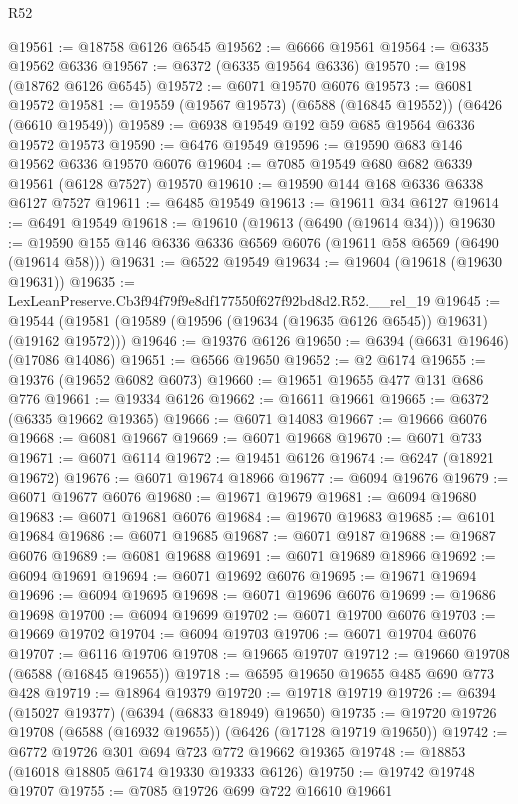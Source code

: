 \begin{lexlean}{R52}
\begin{coremodule}
@19561 := @18758 @6126 @6545
@19562 := @6666 @19561
@19564 := @6335 @19562 @6336
@19567 := @6372 (@6335 @19564 @6336)
@19570 := @198 (@18762 @6126 @6545)
@19572 := @6071 @19570 @6076
@19573 := @6081 @19572
@19581 := @19559 (@19567 @19573) (@6588 (@16845 @19552)) (@6426 (@6610 @19549))
@19589 := @6938 @19549 @192 @59 @685 @19564 @6336 @19572 @19573
@19590 := @6476 @19549
@19596 := @19590 @683 @146 @19562 @6336 @19570 @6076
@19604 := @7085 @19549 @680 @682 @6339 @19561 (@6128 @7527) @19570
@19610 := @19590 @144 @168 @6336 @6338 @6127 @7527
@19611 := @6485 @19549
@19613 := @19611 @34 @6127
@19614 := @6491 @19549
@19618 := @19610 (@19613 (@6490 (@19614 @34)))
@19630 := @19590 @155 @146 @6336 @6336 @6569 @6076 (@19611 @58 @6569 (@6490 (@19614 @58)))
@19631 := @6522 @19549
@19634 := @19604 (@19618 (@19630 @19631))
@19635 := LexLeanPreserve.Cb3f94f79f9e8df177550f627f92bd8d2.R52.__rel_19
@19645 := @19544 (@19581 (@19589 (@19596 (@19634 (@19635 @6126 @6545)) @19631) (@19162 @19572)))
@19646 := @19376 @6126
@19650 := @6394 (@6631 @19646) (@17086 @14086)
@19651 := @6566 @19650
@19652 := @2 @6174
@19655 := @19376 (@19652 @6082 @6073)
@19660 := @19651 @19655 @477 @131 @686 @776
@19661 := @19334 @6126
@19662 := @16611 @19661
@19665 := @6372 (@6335 @19662 @19365)
@19666 := @6071 @14083
@19667 := @19666 @6076
@19668 := @6081 @19667
@19669 := @6071 @19668
@19670 := @6071 @733
@19671 := @6071 @6114
@19672 := @19451 @6126
@19674 := @6247 (@18921 @19672)
@19676 := @6071 @19674 @18966
@19677 := @6094 @19676
@19679 := @6071 @19677 @6076
@19680 := @19671 @19679
@19681 := @6094 @19680
@19683 := @6071 @19681 @6076
@19684 := @19670 @19683
@19685 := @6101 @19684
@19686 := @6071 @19685
@19687 := @6071 @9187
@19688 := @19687 @6076
@19689 := @6081 @19688
@19691 := @6071 @19689 @18966
@19692 := @6094 @19691
@19694 := @6071 @19692 @6076
@19695 := @19671 @19694
@19696 := @6094 @19695
@19698 := @6071 @19696 @6076
@19699 := @19686 @19698
@19700 := @6094 @19699
@19702 := @6071 @19700 @6076
@19703 := @19669 @19702
@19704 := @6094 @19703
@19706 := @6071 @19704 @6076
@19707 := @6116 @19706
@19708 := @19665 @19707
@19712 := @19660 @19708 (@6588 (@16845 @19655))
@19718 := @6595 @19650 @19655 @485 @690 @773 @428
@19719 := @18964 @19379
@19720 := @19718 @19719
@19726 := @6394 (@15027 @19377) (@6394 (@6833 @18949) @19650)
@19735 := @19720 @19726 @19708 (@6588 (@16932 @19655)) (@6426 (@17128 @19719 @19650))
@19742 := @6772 @19726 @301 @694 @723 @772 @19662 @19365
@19748 := @18853 (@16018 @18805 @6174 @19330 @19333 @6126)
@19750 := @19742 @19748 @19707
@19755 := @7085 @19726 @699 @722 @16610 @19661

\end{coremodule}
\end{lexlean}
